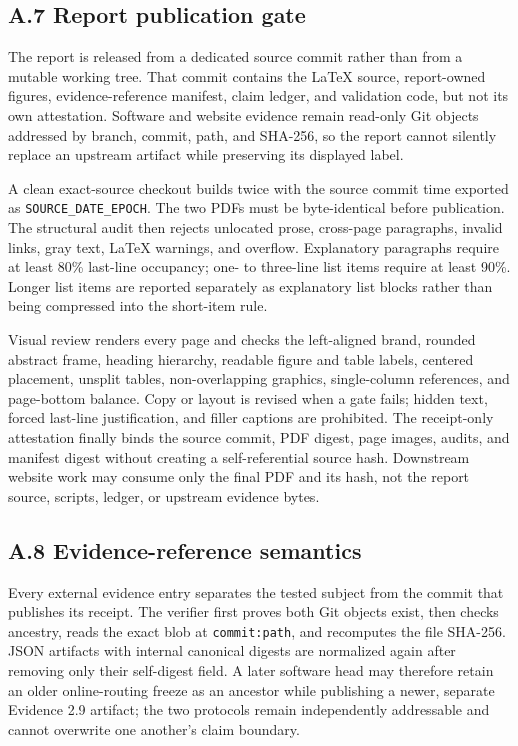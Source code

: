 \subsection{\texorpdfstring{\textbf{A.7 Report publication
gate}}{A.7 Report publication gate}}\label{a.7-report-publication-gate}

The report is released from a dedicated source commit rather than from a
mutable working tree. That commit contains the LaTeX source, report-owned
figures, evidence-reference manifest, claim ledger, and validation code,
but not its own attestation. Software and website evidence remain
read-only Git objects addressed by branch, commit, path, and SHA-256, so
the report cannot silently replace an upstream artifact while preserving
its displayed label.

A clean exact-source checkout builds twice with the source commit time
exported as \texttt{SOURCE\_DATE\_EPOCH}. The two PDFs must be
byte-identical before publication. The structural audit then rejects
unlocated prose, cross-page paragraphs, invalid links, gray text, LaTeX
warnings, and overflow. Explanatory paragraphs require at least 80\%
last-line occupancy; one- to three-line list items require at least 90\%.
Longer list items are reported separately as explanatory list blocks
rather than being compressed into the short-item rule.

Visual review renders every page and checks the left-aligned brand,
rounded abstract frame, heading hierarchy, readable figure and table
labels, centered placement, unsplit tables, non-overlapping graphics,
single-column references, and page-bottom balance. Copy or layout is
revised when a gate fails; hidden text, forced last-line justification,
and filler captions are prohibited. The receipt-only attestation finally
binds the source commit, PDF digest, page images, audits, and manifest
digest without creating a self-referential source hash. Downstream website
work may consume only the final PDF and its hash, not the report source,
scripts, ledger, or upstream evidence bytes.

\subsection{\texorpdfstring{\textbf{A.8 Evidence-reference
semantics}}{A.8 Evidence-reference semantics}}\label{a.8-evidence-reference-semantics}

Every external evidence entry separates the tested subject from the
commit that publishes its receipt. The verifier first proves both Git
objects exist, then checks ancestry, reads the exact blob at
\texttt{commit:path}, and recomputes the file SHA-256. JSON artifacts
with internal canonical digests are normalized again after removing only
their self-digest field. A later software head may therefore retain an
older online-routing freeze as an ancestor while publishing a newer,
separate Evidence 2.9 artifact; the two protocols remain independently
addressable and cannot overwrite one another's claim boundary.

